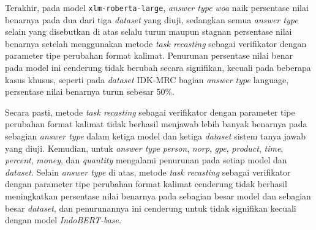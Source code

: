 Terakhir, pada model \texttt{xlm-roberta-large}, \emph{answer type} \emph{woa} naik persentase nilai benarnya pada dua dari tiga \emph{dataset} yang diuji, sedangkan semua \emph{answer type} selain yang disebutkan di atas selalu turun maupun stagnan persentase nilai benarnya setelah menggunakan metode \emph{task recasting} sebagai verifikator dengan parameter tipe perubahan format kalimat. Penurunan persentase nilai benar pada model ini cenderung tidak berubah secara signifikan, kecuali pada beberapa kasus khusus, seperti pada \emph{dataset} IDK-MRC bagian \emph{answer type} {language}, persentase nilai benarnya turun sebesar 50\%.

Secara pasti, metode \emph{task recasting} sebagai verifikator dengan parameter tipe perubahan format kalimat tidak berhasil menjawab lebih banyak benarnya pada sebagian \emph{answer type} dalam ketiga model dan ketiga \emph{dataset} sistem tanya jawab yang diuji. Kemudian, untuk \emph{answer type} \emph{person}, \emph{norp}, \emph{gpe}, \emph{product}, \emph{time}, \emph{percent}, \emph{money}, dan \emph{quantity} mengalami penurunan pada setiap model dan \emph{dataset}. Selain \emph{answer type} di atas, metode \emph{task recasting} sebagai verifikator dengan parameter tipe perubahan format kalimat cenderung tidak berhasil meningkatkan persentase nilai benarnya pada sebagian besar model dan sebagian besar \emph{dataset}, dan penurunannya ini cenderung untuk tidak signifikan kecuali dengan model \emph{IndoBERT-base}. 

